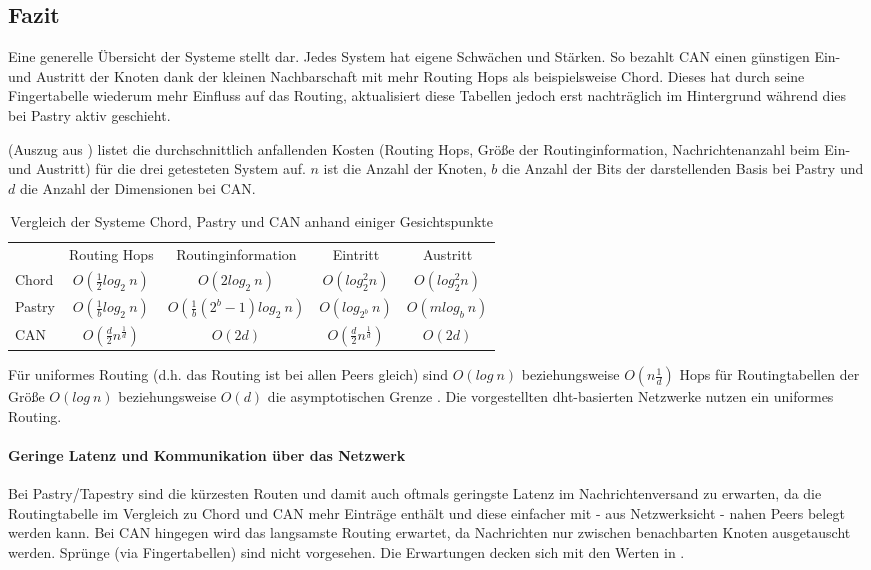\subsection*{Fazit}
Eine generelle Übersicht der Systeme stellt  dar. Jedes System hat eigene Schwächen und Stärken. So bezahlt CAN einen günstigen Ein- und Austritt der Knoten dank der kleinen Nachbarschaft mit mehr Routing Hops als beispielsweise Chord. Dieses hat durch seine Fingertabelle wiederum mehr Einfluss auf das Routing, aktualisiert diese Tabellen jedoch erst nachträglich im Hintergrund während dies bei Pastry aktiv geschieht.

 (Auszug aus \cite{Goetz2005}) listet die durchschnittlich anfallenden Kosten (Routing Hops, Größe der Routinginformation, Nachrichtenanzahl beim Ein- und Austritt) für die drei getesteten System auf. $n$ ist die Anzahl der Knoten, $b$ die Anzahl der Bits der darstellenden Basis bei Pastry und $d$ die Anzahl der Dimensionen bei CAN.

\begin{table}[htbp]
\centering
\label{tab:evaluation_fazit}
\begin{tabular}{lcccc}
\toprule
 & Routing Hops & Routinginformation & Eintritt & Austritt\\ 
 \cmidrule{2-5}
Chord & $O(\frac{1}{2}log_2~n)$ & $O(2log_2~n) $ & $ O(log_2^2 n) $ & $ O(log_2^2 n) $ \\
Pastry & $O(\frac{1}{b}log_2~n)$ & $O(\frac{1}{b} (2^b-1) log_2~n) $ & $ O(log_{2^b}~n) $ & $ O(mlog_b~n) $ \\
CAN & $O(\frac{d}{2}n^\frac{1}{d})	$ & $O(2 d) $ & $ O(\frac{d}{2}n^\frac{1}{d}) $ & $ O(2 d) $ \\
\bottomrule
\end{tabular}
\caption[Vergleich der Systeme Chord, Pastry und CAN]{Vergleich der Systeme Chord, Pastry und CAN anhand einiger Gesichtspunkte}
\end{table}

Für uniformes Routing (d.h. das Routing ist bei allen Peers gleich) sind $O(log~n)$ beziehungsweise $O(n\frac{1}{d})$ Hops für Routingtabellen der Größe $O(log~n)$ beziehungsweise $O(d)$ die asymptotischen Grenze \cite{Xu2004Fundamental}. Die vorgestellten \ac{dht}-basierten Netzwerke nutzen ein uniformes Routing.


\paragraph{Geringe Latenz und Kommunikation über das Netzwerk}
Bei Pastry/Tapestry sind die kürzesten Routen und damit auch oftmals geringste Latenz im Nachrichtenversand zu erwarten, da die Routingtabelle im Vergleich zu Chord und CAN mehr Einträge enthält und diese einfacher mit - aus Netzwerksicht - nahen Peers belegt werden kann. Bei CAN hingegen wird das langsamste Routing erwartet, da Nachrichten nur zwischen benachbarten Knoten ausgetauscht werden. Sprünge (via Fingertabellen) sind nicht vorgesehen. Die Erwartungen decken sich mit den Werten in .

